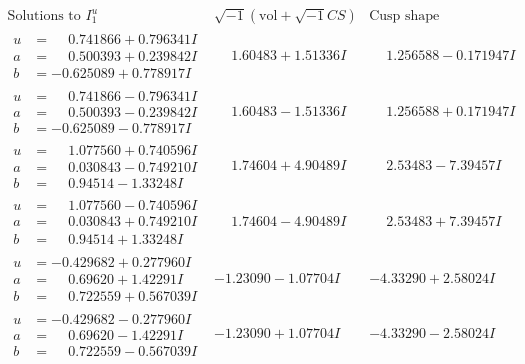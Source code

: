 \documentclass[1p]{elsarticle_modified}
\theoremstyle{definition}
\newcommand{\I}{\sqrt{-1}}
\begin{document}
$$\begin{array}{c|c|c}  
\text{Solutions to }I^u_{1}& \I (\text{vol} + \sqrt{-1}CS) & \text{Cusp shape}\\
 \hline 
\begin{aligned}
u &= \phantom{-}0.741866 + 0.796341 I \\
a &= \phantom{-}0.500393 + 0.239842 I \\
b &= -0.625089 + 0.778917 I\end{aligned}
 & \phantom{-}1.60483 + 1.51336 I & \phantom{-}1.256588 - 0.171947 I \\ \hline\begin{aligned}
u &= \phantom{-}0.741866 - 0.796341 I \\
a &= \phantom{-}0.500393 - 0.239842 I \\
b &= -0.625089 - 0.778917 I\end{aligned}
 & \phantom{-}1.60483 - 1.51336 I & \phantom{-}1.256588 + 0.171947 I \\ \hline\begin{aligned}
u &= \phantom{-}1.077560 + 0.740596 I \\
a &= \phantom{-}0.030843 - 0.749210 I \\
b &= \phantom{-}0.94514 - 1.33248 I\end{aligned}
 & \phantom{-}1.74604 + 4.90489 I & \phantom{-}2.53483 - 7.39457 I \\ \hline\begin{aligned}
u &= \phantom{-}1.077560 - 0.740596 I \\
a &= \phantom{-}0.030843 + 0.749210 I \\
b &= \phantom{-}0.94514 + 1.33248 I\end{aligned}
 & \phantom{-}1.74604 - 4.90489 I & \phantom{-}2.53483 + 7.39457 I \\ \hline\begin{aligned}
u &= -0.429682 + 0.277960 I \\
a &= \phantom{-}0.69620 + 1.42291 I \\
b &= \phantom{-}0.722559 + 0.567039 I\end{aligned}
 & -1.23090 - 1.07704 I & -4.33290 + 2.58024 I \\ \hline\begin{aligned}
u &= -0.429682 - 0.277960 I \\
a &= \phantom{-}0.69620 - 1.42291 I \\
b &= \phantom{-}0.722559 - 0.567039 I\end{aligned}
 & -1.23090 + 1.07704 I & -4.33290 - 2.58024 I \\ \hline\begin{aligned}

\end{aligned}
\end{array}$$
\end{document}

